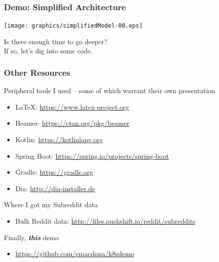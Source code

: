 \begin{frame}
    \frametitle{Demo: Simplified Architecture}
    \texttt{[image: graphics/simplifiedModel-00.eps]}
\end{frame}

\begin{frame}
    \begin{center}
        \Huge Is there enough time to go deeper?\\
        If so, let's dig into some code.
    \end{center}
\end{frame}

\begin{frame}
\frametitle{Other Resources}
Peripheral tools I used -- some of which warrant their own presentation
\begin{itemize}
    \item \LaTeX: \href{https://www.latex-project.org}{https://www.latex-project.org}
    \item Beamer: \href{https://ctan.org/pkg/beamer}{https://ctan.org/pkg/beamer}
    \item Kotlin: \href{https://kotlinlang.org}{https://kotlinlang.org}
    \item Spring Boot: \href{https://spring.io/projects/spring-boot}{https://spring.io/projects/spring-boot}
    \item Gradle: \href{https://gradle.org}{https://gradle.org}
    \item Dia: \href{http://dia-installer.de}{http://dia-installer.de}
\end{itemize}
\smallskip
Where I got my Subreddit data
\begin{itemize}
    \item Bulk Reddit data: \href{http://files.pushshift.io/reddit/subreddits}{http://files.pushshift.io/reddit/subreddits}
\end{itemize}
Finally, \textbf{\textit{this}} demo
\begin{itemize}
    \item \href{https://github.com/emacdona/k8sdemo}{https://github.com/emacdona/k8sdemo}
\end{itemize}
\end{frame}

